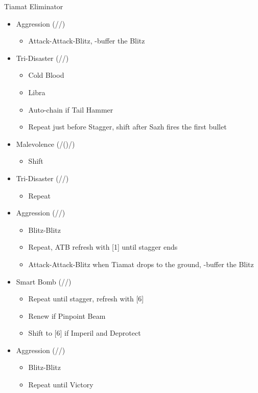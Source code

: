 \begin{multicols}{2}
\begin{menu}
	\end{menu}
	\renewcommand{\first}{[1] Tireless Charge ((\com)/\com/\med)}
	\renewcommand{\second}{[2] Aggression (\com/\com/\rav)}
	\renewcommand{\third}{[3] Consolidation (\sen/\sen/\med)}
	\renewcommand{\fourth}{[4] Malevolence (\syn/(\rav)/\rav)}
	\renewcommand{\fifth}{[5] Smart Bomb (\rav/\rav/\sab)}
	\renewcommand{\sixth}{[6] Tri-Disaster (\rav/\rav/\rav)}
	\begin{battle}{Tiamat Eliminator}
		\begin{itemize}
			\item \second
			      \begin{itemize}
				      \item Attack-Attack-Blitz, \rav-buffer the Blitz
			      \end{itemize}
			\item \sixth
			      \begin{itemize}
				      \item Cold Blood
				      \item Libra
				      \item Auto-chain if Tail Hammer
				      \item Repeat just before Stagger, shift after Sazh fires the first bullet
			      \end{itemize}
			\item \fourth
			      \begin{itemize}
				      \item Shift
			      \end{itemize}
			\item \sixth
			      \begin{itemize}
				      \item Repeat
			      \end{itemize}
			\item \second
			      \begin{itemize}
				      \item Blitz-Blitz
				      \item Repeat, ATB refresh with [1] until stagger ends
				      \item Attack-Attack-Blitz when Tiamat drops to the ground, \rav-buffer the Blitz
			      \end{itemize}
			\item \fifth
			      \begin{itemize}
				      \item Repeat until stagger, refresh with [6]
				      \item Renew if Pinpoint Beam
				      \item Shift to [6] if Imperil and Deprotect
			      \end{itemize}
			\item \second
			      \begin{itemize}
				      \item Blitz-Blitz
				      \item Repeat until Victory
			      \end{itemize}
		\end{itemize}
	\end{battle}


\end{multicols}
